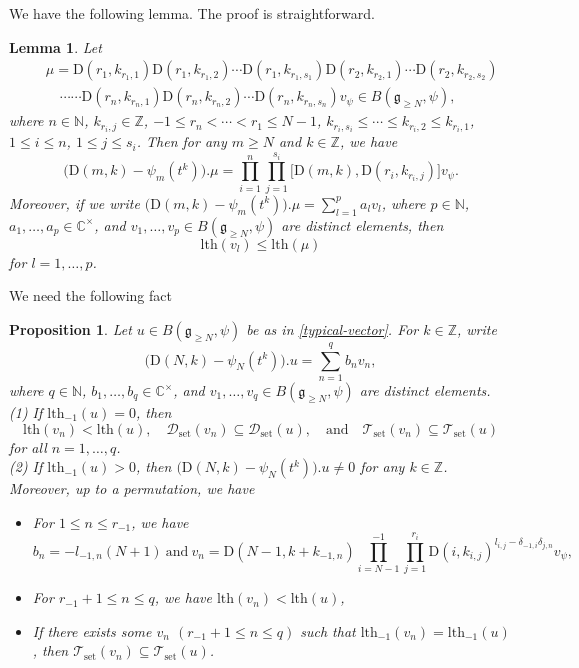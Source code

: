 \documentclass[12pt, a4paper]{amsart}
\newcommand{\fg}{\mathfrak g}
\newcommand{\C}{\mathbb{C}}
\newcommand{\N}{\mathbb N}
\newcommand{\Z}{\mathbb Z}
\newcommand{\rD}{\mathrm{D}}
\theoremstyle{Theorem}
\theoremstyle{Theorem}
\newtheorem{lemma}[thm]{Lemma}
\newtheorem{proposition}[thm]{Proposition}
\numberwithin{equation}{section}
\begin{document}
We have the following lemma. The proof is straightforward.
\begin{lemma}\label{direct-calculate}
Let \begin{eqnarray*}&&\mu=\rD(r_{1},k_{r_{1},1})\rD(r_{1},k_{r_{1},2})\cdots
\rD(r_{1},k_{r_{1},s_{1}})\rD(r_{2},k_{r_{2},1})\cdots
\rD(r_{2},k_{r_{2},s_{2}})\\&&
\quad\cdots\cdots\rD(r_{n},k_{r_{n},1})\rD(r_{n},k_{r_{n},2})\cdots
\rD(r_{n},k_{r_{n},s_{n}})v_{\psi}\in B(\fg_{\geq N},\psi),\end{eqnarray*}
where $n\in\N$, $k_{r_{i},j}\in\Z$, $-1\leq r_{n}<\cdots<r_{1}\leq N-1$,
$k_{r_{i},s_{i}}\leq\cdots\leq k_{r_{i},2}\leq k_{r_{i},1}$, $1\leq i\leq n$, $1\leq j\leq s_{i}$.
Then for any $m\geq N$ and $k\in\Z$, we have
\[\big(\rD(m,k)-\psi_{m}(t^{k})\big).\mu
=\prod_{i=1}^{n}\prod_{j=1}^{s_{i}}\big[\rD(m,k),\rD(r_{i},k_{r_{i},j})\big]v_{\psi}.\]
Moreover, if we write
$\big(\rD(m,k)-\psi_{m}(t^{k})\big).\mu=\sum_{l=1}^{p}a_{l}v_{l}$,
where $p\in\N$, $a_{1},\dots,a_{p}\in\C^{\times}$, and $v_{1},\dots,v_{p}\in B(\fg_{\geq N},\psi)$ are distinct elements,
then \[\mathrm{lth}(v_{l})\leq \mathrm{lth}(\mu)\]
for $l=1,\dots,p$.
\end{lemma}

We need the following fact
\begin{proposition}\label{ele-lemma}
Let $u\in B(\fg_{\geq N},\psi)$ be as in \eqref{typical-vector}. For $k\in\Z$, write
\[\big(\rD(N,k)-\psi_{N}(t^{k})\big).u=\sum_{n=1}^{q}b_{n}v_{n},\]
where $q\in\N$, $b_{1},\dots,b_{q}\in\C^{\times}$,
and $v_{1},\dots,v_{q}\in B(\fg_{\geq N},\psi)$ are distinct elements.\\
(1) If $\mathrm{lth}_{-1}(u)=0$, then
\[\mathrm{lth}(v_{n})<\mathrm{lth}(u),\quad\mathcal{D}_{\mathrm{set}}(v_{n})\subseteq\mathcal{D}_{\mathrm{set}}(u),
\quad\text{and}\quad\mathcal{T}_{\mathrm{set}}(v_{n})\subseteq\mathcal{T}_{\mathrm{set}}(u)\]
for all $n=1,\dots,q$.\\
(2) If $\mathrm{lth}_{-1}(u)>0$, then $\big(\rD(N,k)-\psi_{N}(t^{k})\big).u\neq0$ for any $k\in\Z$.
Moreover, up to a permutation, we have
\begin{itemize}
\item[(i)] For $1\leq n\leq r_{-1}$, we have \[b_{n}=-l_{-1,n}(N+1)\ \text{and}\  v_{n}=\rD(N-1,k+k_{-1,n})\prod_{i=N-1}^{-1}\prod_{j=1}^{r_{i}}\rD(i,k_{i,j})^{l_{i,j}-\delta_{-1,i}\delta_{j,n}}v_{\psi},\]
\item[(ii)] For $r_{-1}+1\leq n\leq q$, we have $\mathrm{lth}(v_{n})<\mathrm{lth}(u)$,
\item[(iii)] If there exists some $v_{n}$ $(r_{-1}+1\leq n\leq q)$
such that $\mathrm{lth}_{-1}(v_{n})=\mathrm{lth}_{-1}(u)$, then
$\mathcal{T}_{\mathrm{set}}(v_{n})\subseteq\mathcal{T}_{\mathrm{set}}(u)$.
\end{itemize}
\end{proposition}
\end{document}
